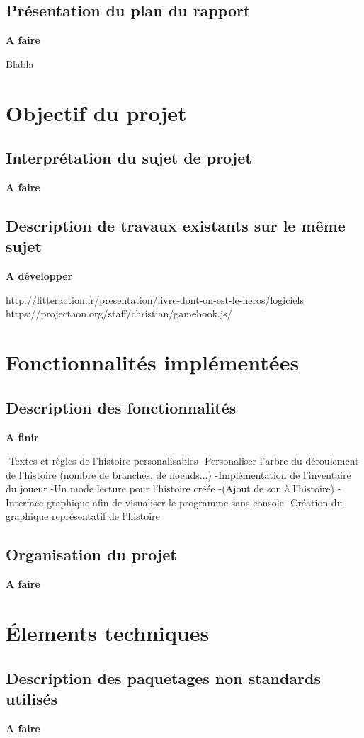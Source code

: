\documentclass[12pt]{article}
\begin{document}
\subsection{Présentation du plan du rapport}
\textbf{A faire}

Blabla
\section{Objectif du projet}
\subsection{Interprétation du sujet de projet}
\textbf{A faire}
\subsection{Description de travaux existants sur le même sujet	}
\noindent
\textbf{A développer}

\noindent
http://litteraction.fr/presentation/livre-dont-on-est-le-heros/logiciels \medskip
\\
https://projectaon.org/staff/christian/gamebook.js/
\section{Fonctionnalités implémentées}
\subsection{Description des fonctionnalités}
\textbf{A finir}

\noindent
-Textes et règles de l'histoire personalisables 
-Personaliser l'arbre du déroulement de l'histoire (nombre de branches, de noeuds...)
-Implémentation de l'inventaire du joueur
-Un mode lecture pour l'histoire créée
-(Ajout de son à l'histoire)
-Interface graphique afin de visualiser le programme sans console
-Création du graphique représentatif de l'histoire
\subsection{Organisation du projet}
\textbf{A faire}
\newpage
\section{\'Elements techniques}
\subsection{Description des paquetages non standards utilisés}
\textbf{A faire}
\end{document}

